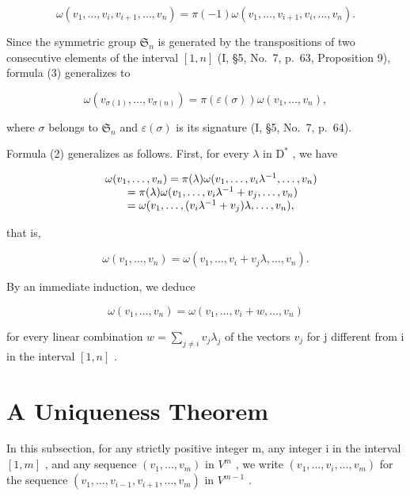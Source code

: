 \[
\omega (v _ {1}, \dots , v _ {i}, v _ {i + 1}, \dots , v _ {n}) = \pi (- 1) \omega (v _ {1}, \dots , v _ {i + 1}, v _ {i}, \dots , v _ {n}).\tag{3}
\]

Since the symmetric group \(\mathfrak{S}_n\) is generated by the transpositions of two consecutive elements of the interval \([1,n]\) (I, §5, No.~7, p.~63, Proposition 9), formula (3) generalizes to

\[
\omega (v _ {\sigma (1)}, \ldots , v _ {\sigma (n)}) = \pi (\varepsilon (\sigma)) \omega (v _ {1}, \ldots , v _ {n}),\tag{4}
\]

where \(\sigma\) belongs to \(\mathfrak{S}_n\) and \(\varepsilon (\sigma)\) is its signature (I, §5, No.~7, p.~64).

Formula (2) generalizes as follows. First, for every \(\lambda\) in \(\mathrm{D}^*\) , we have

\[
\begin{array}{r l} & {\omega (v _ {1}, \ldots , v _ {n}) = \pi (\lambda) \omega (v _ {1}, \ldots , v _ {i} \lambda^ {- 1}, \ldots , v _ {n})} \\ & {\qquad = \pi (\lambda) \omega (v _ {1}, \ldots , v _ {i} \lambda^ {- 1} + v _ {j}, \ldots , v _ {n})} \\ & {\qquad = \omega (v _ {1}, \ldots , (v _ {i} \lambda^ {- 1} + v _ {j}) \lambda , \ldots , v _ {n}),} \end{array}
\]

that is,

\[
\omega (v _ {1}, \dots , v _ {n}) = \omega (v _ {1}, \dots , v _ {i} + v _ {j} \lambda , \dots , v _ {n}).\tag{5}
\]

By an immediate induction, we deduce

\[
\omega (v _ {1}, \ldots , v _ {n}) = \omega (v _ {1}, \ldots , v _ {i} + w, \ldots , v _ {n})\tag{6}
\]

for every linear combination \(w = \sum_{j \neq i} v_j \lambda_j\) of the vectors \(v_j\) for j different from i in the interval \([1, n]\) .

\section{A Uniqueness Theorem}

In this subsection, for any strictly positive integer m, any integer i in the interval \([1,m]\) , and any sequence \((v_{1},\ldots,v_{m})\) in \(V^{m}\) , we write \((v_{1},\ldots,\widehat{v_{i}},\ldots,v_{m})\) for the sequence \((v_{1},\ldots,v_{i-1},v_{i+1},\ldots,v_{m})\) in \(V^{m-1}\) .

